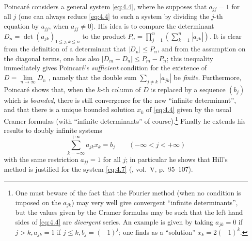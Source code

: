 \documentclass[12pt,a4paper,leqno,twoside]{extbook}
\begin{document}
Poincaré considers a general system \eqref{eq:4.4}, where he supposes that \(a_{jj}=1\) for all \(j\) (one can always reduce \eqref{eq:4.4} to such a system by dividing the \(j\)-th equation by \(a_{jj}\), when \(a_{jj} \neq 0\)). His idea is to compare the determinant \(D_n = \det(a_{jk})_{1 \leq j, k \leq n}\) to the product \(P_n = \prod\limits_{j=1}^n \left( \sum_{k=1}^n |a_{jk}| \right)\). It is clear from the definition of a determinant that \(|D_n| \leq P_n\), and from the assumption on the diagonal terms, one has also \(|D_m - D_n| \leq P_m - P_n\); this inequality immediately gives Poincaré's \emph{sufficient} condition for the existence of \(D = \lim\limits_{n \to \infty} D_n\) , namely that the double sum \(\sum\limits_{j \neq k} |a_{jk}|\) be \emph{finite}. Furthermore, Poincaré shows that, when the \(k\)-th column of \(D\) is replaced by a sequence \((b_j)\) which is \emph{bounded}, there is still convergence for the new ``infinite determinant'', and that there is a unique bounded solution \(x_k\) of \eqref{eq:4.4} given by the usual Cramer formulas (with ``infinite determinants'' of course).\footnote{One must beware of the fact that the Fourier method (when no condition is imposed on the \(a_{jk}\)) may very well give convergent ``infinite determinants'', but the values given by the Cramer formulas may be such that the left hand sides of \eqref{eq:4.4} are \emph{divergent} series. An example is given by taking \(a_{jk} = 0\) if \(j > k, a_{jk} = 1\) if \(j \leq k, b_j = (-1)^j\); one finds as a ``solution'' \(x_k = 2(-1)^k\).} Finally he extends his results to doubly infinite systems
\begin{equation}
    \label{eq:4.8}
    \sum_{k=-\infty}^{+\infty} a_{jk} x_k = b_j \qquad (-\infty < j < +\infty)
\end{equation}
with the same restriction \(a_{jj} = 1\) for all \(j\); in particular he shows that Hill's method is justified for the system \eqref{eq:4.7} (\cite{177}, vol.~V, p.~95--107).
\end{document}
